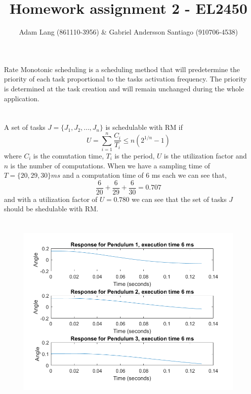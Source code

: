 \documentclass[12pt,a4paper]{article}
\title{Homework assignment 2 - EL2450}
\author{Adam Lang (861110-3956) \& Gabriel Andersson Santiago
(910706-4538)}
\begin{document}
\maketitle
\section{} %
  Rate Monotonic scheduling is a scheduling method that will
  predetermine the priority of each task proportional to the tasks
  activation frequency. The priority is determined at the task creation
  and will remain unchanged during the whole application.

\section{} %
  A set of tasks $J=\{J_1,J_2,...,J_n\}$ is schedulable with RM if
  \begin{equation}
    U=\sum\limits_{i=1}^n \frac{C_i}{T_i} \leq n(2^{1/n}-1)
  \end{equation}
  where $C_i$ is the comutation time, $T_i$ is the period, $U$ is the
  utilization factor and $n$ is the
  number of computations. When we have a sampling time of 
  $T=\{20, 29, 30\}ms$ and a computation time of 6 ms each we can see that,
  \begin{equation}
    \frac{6}{20}+\frac{6}{29}+\frac{6}{30}=0.707
  \end{equation}
  and with a utilization factor of $U = 0.780$ we can see that the set
  of tasks $J$ should be shedulable with RM.

\section{}%
    \begin{center}
      \begin{figure}
        \includegraphics[scale=0.5]{ex31.png}
      \end{figure}
        \caption{Pendulum angles for the three different pendulums}
    \end{center}
    
\end{document}
